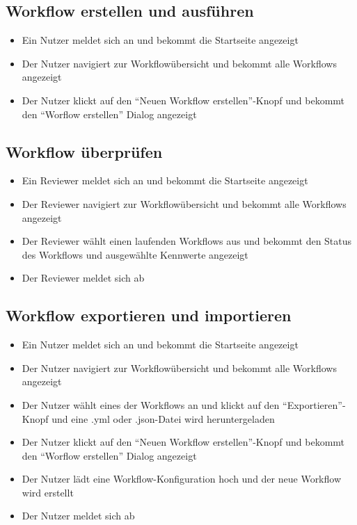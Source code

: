 \subsection*{Workflow erstellen und ausführen}
\begin{itemize}
    \item Ein \Gls{Nutzer} meldet sich an und bekommt die Startseite angezeigt
    \item Der \Gls{Nutzer} navigiert zur Workflowübersicht und bekommt alle Workflows angezeigt
    \item Der \gls{Nutzer} klickt auf den \enquote{Neuen Workflow erstellen}-Knopf und bekommt den \enquote{Worflow erstellen} Dialog angezeigt
\end{itemize}

%
\subsection*{Workflow überprüfen}
\begin{itemize}
    \item Ein \Gls{Reviewer} meldet sich an und bekommt die Startseite angezeigt
    \item Der \Gls{Reviewer} navigiert zur Workflowübersicht und bekommt alle Workflows angezeigt
    \item Der \Gls{Reviewer} wählt einen laufenden Workflows aus und bekommt den Status des Workflows und ausgewählte Kennwerte angezeigt
    \item Der \gls{Reviewer} meldet sich ab
\end{itemize}

\subsection*{Workflow exportieren und importieren}
\begin{itemize}
    \item Ein \gls{Nutzer} meldet sich an und bekommt die Startseite angezeigt
    \item Der \gls{Nutzer} navigiert zur Workflowübersicht und bekommt alle Workflows angezeigt
    \item Der \gls{Nutzer} wählt eines der Workflows an und klickt auf den \enquote{Exportieren}-Knopf und eine .yml oder .json-Datei wird heruntergeladen
    \item Der \gls{Nutzer} klickt auf den \enquote{Neuen Workflow erstellen}-Knopf und bekommt den \enquote{Worflow erstellen} Dialog angezeigt
    \item Der \gls{Nutzer} lädt eine Workflow-Konfiguration hoch und der neue Workflow wird erstellt
    \item Der \gls{Nutzer} meldet sich ab
\end{itemize}


